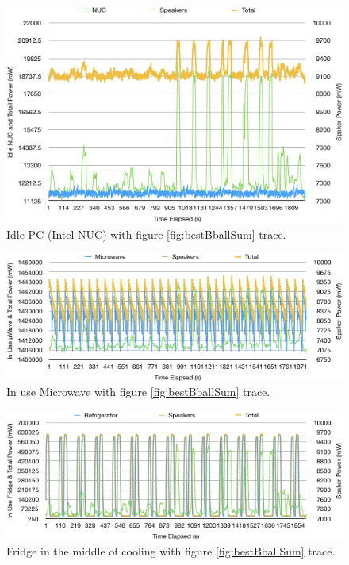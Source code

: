 \begin{figure}[H]
  \centering
  \includegraphics[width=1\textwidth]{figures/nucIdle.png}
  \caption{Idle PC (Intel NUC) with figure \ref{fig:bestBballSum} trace.}
  \label{fig:nucIdle}
\end{figure}

\begin{figure}[H]
  \centering
  \includegraphics[width=1\textwidth]{figures/uWaveInUse.png}
  \caption{In use Microwave with figure \ref{fig:bestBballSum} trace.}
  \label{fig:uWaveInUse}
\end{figure}

\begin{figure}[H]
  \centering
  \includegraphics[width=1\textwidth]{figures/fridgeInUse.png}
  \caption{Fridge in the middle of cooling with figure \ref{fig:bestBballSum} trace.}
  \label{fig:fridgeInUse}
\end{figure}

